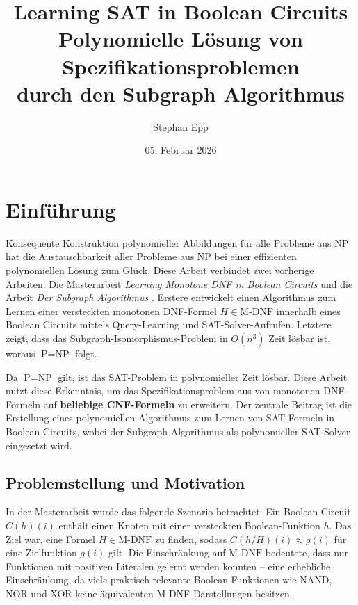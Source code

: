 ﻿\documentclass[a4paper,12pt]{article}
\title{\textbf{Learning SAT in Boolean Circuits}\\[0.5ex]
	\large Polynomielle Lösung von Spezifikationsproblemen\\durch den Subgraph Algorithmus}
\author{Stephan Epp}
\date{05. Februar 2026}
\theoremstyle{definition}
\begin{document}
\maketitle

\tableofcontents
\newpage

\section{Einführung}
Konsequente Konstruktion polynomieller Abbildungen für alle Probleme aus NP hat die Austauschbarkeit aller Probleme aus NP bei einer effizienten polynomiellen Lösung zum Glück. Diese Arbeit verbindet zwei vorherige Arbeiten: Die Masterarbeit \textit{Learning Monotone DNF in Boolean Circuits} \cite{Epp13} und die Arbeit \textit{Der Subgraph Algorithmus} \cite{Epp26}. Erstere entwickelt einen Algorithmus zum Lernen einer versteckten monotonen DNF-Formel $H \in \text{M-DNF}$ innerhalb eines Boolean Circuits mittels Query-Learning und SAT-Solver-Aufrufen. Letztere zeigt, dass das Subgraph-Isomorphismus-Problem in $O(n^3)$ Zeit lösbar ist, woraus $\text{P} = \text{NP}$ folgt.

Da $\text{P} = \text{NP}$ gilt, ist das SAT-Problem in polynomieller Zeit lösbar. Diese Arbeit nutzt diese Erkenntnis, um das Spezifikationsproblem aus \cite{Epp13} von monotonen DNF-Formeln auf \textbf{beliebige CNF-Formeln} zu erweitern. Der zentrale Beitrag ist die Erstellung eines polynomiellen Algorithmus zum Lernen von SAT-Formeln in Boolean Circuits, wobei der Subgraph Algorithmus als polynomieller SAT-Solver eingesetzt wird.

\subsection{Problemstellung und Motivation}

In der Masterarbeit \cite{Epp13} wurde das folgende Szenario betrachtet: Ein Boolean Circuit $C(h)(i)$ enthält einen Knoten mit einer versteckten Boolean-Funktion $h$. Das Ziel war, eine Formel $H \in \text{M-DNF}$ zu finden, sodass $C(h/H)(i) \approx g(i)$ für eine Zielfunktion $g(i)$ gilt. Die Einschränkung auf $\text{M-DNF}$ bedeutete, dass nur Funktionen mit positiven Literalen gelernt werden konnten -- eine erhebliche Einschränkung, da viele praktisch relevante Boolean-Funktionen wie NAND, NOR und XOR keine äquivalenten M-DNF-Darstellungen besitzen.
\end{document}
